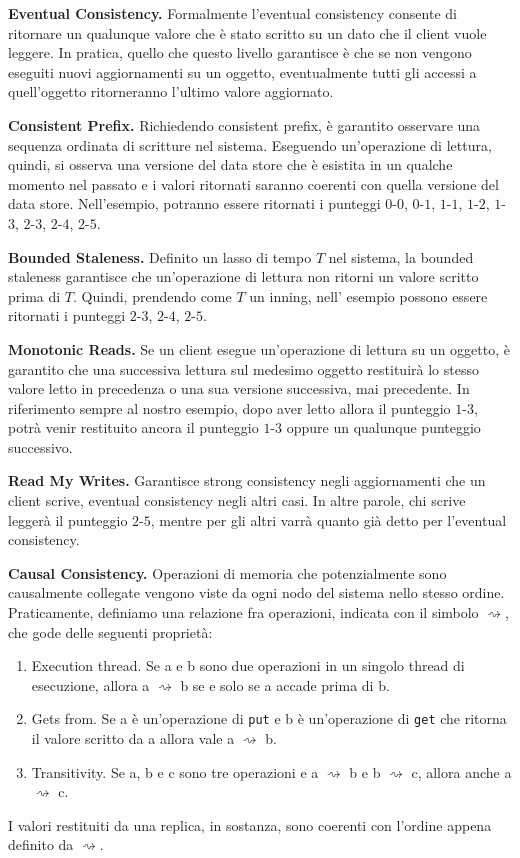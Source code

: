 \documentclass[twoside]{article}
\begin{document}
\begin{multicols}{2}
\textbf{Eventual Consistency.} Formalmente l'eventual consistency consente di ritornare un qualunque valore che è stato scritto su un dato che il client vuole leggere. In pratica, quello che questo livello garantisce è che se non vengono eseguiti nuovi aggiornamenti su un oggetto, eventualmente tutti gli accessi a quell'oggetto ritorneranno l'ultimo valore aggiornato.

\textbf{Consistent Prefix.} Richiedendo consistent prefix, è garantito osservare una sequenza ordinata di scritture nel sistema. Eseguendo un'operazione di lettura, quindi, si osserva una versione del data store che è esistita in un qualche momento nel passato e i valori ritornati saranno coerenti con quella versione del data store. Nell'esempio, potranno essere ritornati i punteggi $0$-$0$, $0$-$1$, $1$-$1$, $1$-$2$, $1$-$3$, $2$-$3$, $2$-$4$, $2$-$5$.

\textbf{Bounded Staleness.} Definito un lasso di tempo $T$ nel sistema, la bounded staleness garantisce che un'operazione di lettura non ritorni un valore scritto prima di $T$. Quindi, prendendo come $T$ un inning, nell' esempio possono essere ritornati i punteggi $2$-$3$, $2$-$4$, $2$-$5$.

\textbf{Monotonic Reads.} Se un client esegue un'operazione di lettura su un oggetto, è garantito che una successiva lettura sul medesimo oggetto restituirà lo stesso valore letto in precedenza o una sua versione successiva, mai precedente. In riferimento sempre al nostro esempio, dopo aver letto allora il punteggio $1$-$3$, potrà venir restituito ancora il punteggio $1$-$3$ oppure un qualunque punteggio successivo.

\textbf{Read My Writes.} Garantisce strong consistency negli aggiornamenti che un client scrive, eventual consistency negli altri casi. In altre parole, chi scrive leggerà il punteggio $2$-$5$, mentre per gli altri varrà quanto già detto per l'eventual consistency.

\textbf{Causal Consistency.} Operazioni di memoria che potenzialmente sono causalmente collegate vengono viste da ogni nodo del sistema nello stesso ordine. Praticamente, definiamo una relazione fra operazioni, indicata con il simbolo $\rightsquigarrow$, che gode delle seguenti proprietà:
\begin{enumerate}[topsep=0pt,itemsep=-1ex,partopsep=1ex,parsep=1ex]
\item Execution thread. Se a e b sono due operazioni in un singolo thread di esecuzione, allora a $\rightsquigarrow$ b se e solo se a accade prima di b.
\item Gets from. Se a è un'operazione di \texttt{put} e b è un'operazione di \texttt{get} che ritorna il valore scritto da a allora vale a $\rightsquigarrow$ b.
\item Transitivity. Se a, b e c sono tre operazioni e a $\rightsquigarrow$ b e b $\rightsquigarrow$ c, allora anche a $\rightsquigarrow$ c.
\end{enumerate}
I valori restituiti da una replica, in sostanza, sono coerenti con l'ordine appena definito da $\rightsquigarrow$.


\end{multicols}
\end{document}
